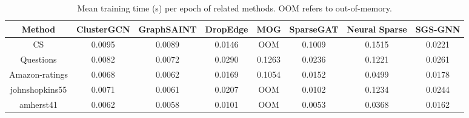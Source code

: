 \begin{table}[!htbp]
\caption{Mean training time (s) per epoch of related methods. OOM refers to out-of-memory.}
\label{tab:runtimerelated}
\centering
\begin{sc}
\resizebox{1.0\columnwidth}{!}
{
\def\arraystretch{1.0}
\begin{tabular}{@{}c|ccccccc@{}}
\toprule
\textbf{Method} & \textbf{ClusterGCN} & \textbf{GraphSAINT} & \textbf{DropEdge} & \textbf{MOG} & \textbf{SparseGAT} & \textbf{Neural Sparse} & \textbf{SGS-GNN} \\ \midrule
CS & 0.0095 & 0.0089 & 0.0146 & OOM & 0.1009 & 0.1515 & 0.0221 \\
Questions & 0.0082 & 0.0072 & 0.0290 & 0.1263 & 0.0236 & 0.1221 & 0.0261 \\
Amazon-ratings & 0.0068 & 0.0062 & 0.0169 & 0.1054 & 0.0152 & 0.0499 & 0.0178 \\
johnshopkins55 & 0.0071 & 0.0061 & 0.0207 & OOM & 0.0102 & 0.1234 & 0.0244 \\
amherst41 & 0.0062 & 0.0058 & 0.0101 & OOM & 0.0053 & 0.0368 & 0.0162 \\ \bottomrule
\end{tabular}
}
\end{sc}
\end{table}
\clearpage